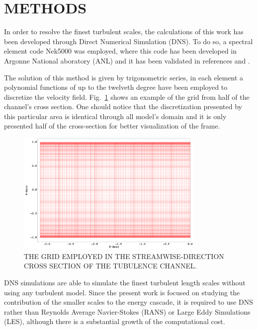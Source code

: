 \documentclass[twocolumn,10pt]{asme2e}
\begin{document}
\section*{METHODS}

In order to resolve the finest turbulent scales, the calculations of this work has been developed through Direct Numerical Simulation (DNS). To do so, a spectral element code Nek5000 was employed, where this code has been developed in Argonne National aboratory (ANL) and it has been validated in references \cite{merzari2013} and \cite{Obabko2011}.

The solution of this method is given by trigonometric series, in each element a polynomial functions of up to the twelveth degree have been employed to discretize the velocity field. Fig.~\ref{fig:cross_grid} shows an example of the grid from half of the channel's cross section. One should notice that the discretization presented by this particular area is identical through all model's domain and it is only presented half of the cross-section for better visualization of the frame.

\begin{figure}[!htbp]
\begin{center}
\setlength{\unitlength}{0.012500in}%
  \includegraphics[trim = 20mm 15mm 20mm 10mm, width = 90mm]{half_cross_section_mesh.png}
\end{center}
  \caption{THE GRID EMPLOYED IN THE STREAMWISE-DIRECTION CROSS SECTION OF THE TUBULENCE CHANNEL.}
  \label{fig:cross_grid}
\end{figure}

DNS simulations are able to simulate the finest turbulent length scales without using any turbulent model. Since the present work is focused on studying the contribution of the smaller scales to the energy cascade, it is required to use DNS rather than Reynolds Average Navier-Stokes (RANS) or Large Eddy Simulations (LES), although there is a substantial growth of the computational cost.
\end{document}
